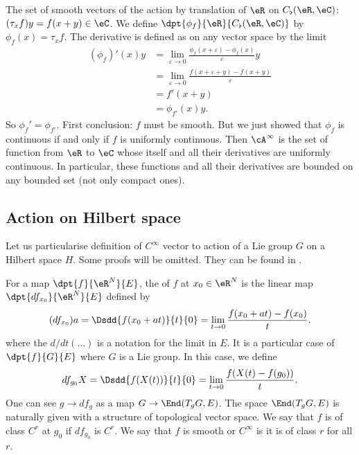 \begin{example}
	The set of smooth vectors of the action by translation of $\eR$ on $ C_{\flat}(\eR,\eC)$: $(\tau_xf)y=f(x+y)\in\eC$. We define $\dpt{\phi_f}{\eR}{C_{\flat}(\eR,\eC)}$ by $\phi_f(x)=\tau_xf$. The derivative is defined as on any vector space by the limit
	\begin{equation}
		\begin{split}
			(\phi_f)'(x)y&=\lim_{\varepsilon\to 0}\frac{\phi_f(x+\varepsilon)-\phi_f(x)}{\varepsilon}y\\
			&=\lim_{\varepsilon\to 0}\frac{f(x+\varepsilon+y)-f(x+y)}{\varepsilon}\\
			&=f'(x+y)\\
			&=\phi_{f'}(x)y.
		\end{split}
	\end{equation}
	So $\phi_f'=\phi_{f'}$. First conclusion: $f$ must be smooth. But we just showed that $\phi_f$ is continuous if and only if $f$ is uniformly continuous. Then $\cA^{\infty}$ is the set of function from $\eR$ to $\eC$ whose itself and all their derivatives are uniformly continuous. In particular, these functions and all their derivatives are bounded on any bounded set (not only compact ones).

\end{example}

\subsection{Action on Hilbert space}

Let us particularise definition of $ C^{\infty}$ vector to action of a Lie group $G$ on a Hilbert space $H$. Some proofs will be omitted. They can be found in \cite{Knapp_reprez}.

For a map $\dpt{f}{\eR^N}{E}$, the  of $f$ at $x_0\in\eR^N$ is the linear map $\dpt{df_{x_0}}{\eR^N}{E}$ defined by
\begin{equation}
	(df_{x_0})a=\Dsdd{ f(x_0+at) }{t}{0}=\lim_{t\to 0}\frac{f(x_0+at)-f(x_0)}{t}.
\end{equation}
where the $d/dt(\ldots)$ is a notation for the limit in $E$. It is a particular case of $\dpt{f}{G}{E}$ where $G$ is a Lie group. In this case, we define
\begin{equation}
	df_{g_0}X=\Dsdd{ f(X(t)) }{t}{0}=\lim_{t\to 0}\frac{f(X(t)-f(g_0))}{t}.
\end{equation}
One can see $g\to df_g$ as a map $G\to \End(T_gG,E)$. The space $\End(T_gG,E)$ is naturally given with a structure of topological vector space. We say that $f$ is of class $C^r$ at $g_0$ if $df_{g_0}$ is $C^r$. We say that $f$ is smooth or $ C^{\infty}$ is it is of class $r$ for all $r$.

